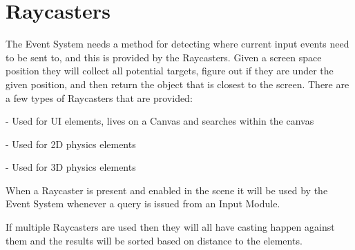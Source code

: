 \chapter{Raycasters}
\hypertarget{md__library_2_package_cache_2com_8unity_8ugui_0d1_80_80_2_documentation_0i_2_raycasters}{}\label{md__library_2_package_cache_2com_8unity_8ugui_0d1_80_80_2_documentation_0i_2_raycasters}
\label{md__library_2_package_cache_2com_8unity_8ugui_0d1_80_80_2_documentation_0i_2_raycasters_autotoc_md1340}%
%
 The Event System needs a method for detecting where current input events need to be sent to, and this is provided by the Raycasters. Given a screen space position they will collect all potential targets, figure out if they are under the given position, and then return the object that is closest to the screen. There are a few types of Raycasters that are provided\+:


\begin{DoxyItemize}
\item {} -\/ Used for UI elements, lives on a Canvas and searches within the canvas
\item {} -\/ Used for 2D physics elements
\item {} -\/ Used for 3D physics elements
\end{DoxyItemize}

When a Raycaster is present and enabled in the scene it will be used by the Event System whenever a query is issued from an Input Module.

If multiple Raycasters are used then they will all have casting happen against them and the results will be sorted based on distance to the elements. 